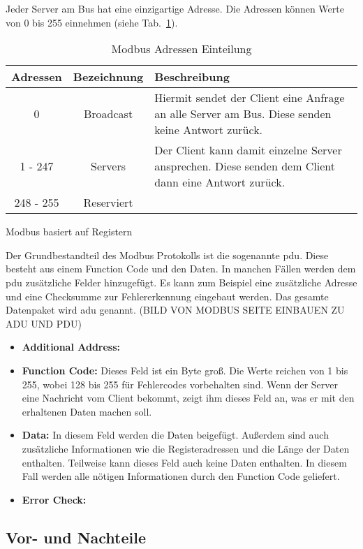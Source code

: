 Jeder Server am Bus hat eine einzigartige Adresse. Die Adressen können Werte von 0 bis 255 einnehmen (siehe Tab.~\ref{tab:modbus_adressen}). 
\begin{table}[h]
	\caption{Modbus Adressen Einteilung \label{tab:modbus_adressen}}
	\begin{tabularx}{\textwidth}{@{}c|c|X@{}}
		\toprule
		\textbf{Adressen} & \textbf{Bezeichnung} & \textbf{Beschreibung} \\
		\midrule
		0 & Broadcast & Hiermit sendet der Client eine Anfrage an alle Server am Bus. Diese senden keine Antwort zurück. \\
		1 - 247 & Servers & Der Client kann damit einzelne Server ansprechen. Diese senden dem Client dann eine Antwort zurück. \\
		248 - 255 & Reserviert & \\
		\bottomrule
	\end{tabularx}
\end{table}
\cite{Modbus_Organization_SL:2012}

Modbus basiert auf Registern 

Der Grundbestandteil des Modbus Protokolls ist die sogenannte \acf{pdu}. Diese besteht aus einem Function Code und den Daten. In manchen Fällen werden dem \acs{pdu} zusätzliche Felder hinzugefügt. Es kann zum Beispiel eine zusätzliche Adresse und eine Checksumme zur Fehlererkennung eingebaut werden. Das gesamte Datenpaket wird \acf{adu} genannt.
(BILD VON MODBUS SEITE EINBAUEN ZU ADU UND PDU)
\begin{itemize}
	\item \textbf{Additional Address:}
	\item \textbf{Function Code:} Dieses Feld ist ein Byte groß. Die Werte reichen von 1 bis 255, wobei 128 bis 255 für Fehlercodes vorbehalten sind. Wenn der Server eine Nachricht vom Client bekommt, zeigt ihm dieses Feld an, was er mit den erhaltenen Daten machen soll. 
	\item \textbf{Data:} In diesem Feld werden die Daten beigefügt. Außerdem sind auch zusätzliche Informationen wie die Registeradressen und die Länge der Daten enthalten. Teilweise kann dieses Feld auch keine Daten enthalten. In diesem Fall werden alle nötigen Informationen durch den Function Code geliefert.
	\item \textbf{Error Check:} 
\end{itemize}


\cite{Modbus_Organization_AP:2012}

\subsection{Vor- und Nachteile}


